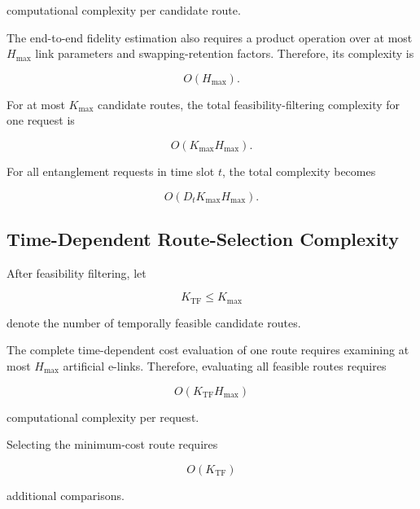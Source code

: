 computational complexity per candidate route.

The end-to-end fidelity estimation also requires a product operation over at most $H_{\max}$ link parameters and swapping-retention factors. Therefore, its complexity is

\begin{equation}
    O
    \left(
    H_{\max}
    \right).
\end{equation}

For at most $K_{\max}$ candidate routes, the total feasibility-filtering complexity for one request is

\begin{equation}
    O
    \left(
    K_{\max}H_{\max}
    \right).
\end{equation}

For all entanglement requests in time slot $t$, the total complexity becomes

\begin{equation}
    O
    \left(
    D_tK_{\max}H_{\max}
    \right).
\end{equation}


\subsection{Time-Dependent Route-Selection Complexity}

After feasibility filtering, let

\begin{equation}
    K_{\mathrm{TF}}
    \leq
    K_{\max}
\end{equation}

denote the number of temporally feasible candidate routes.

The complete time-dependent cost evaluation of one route requires examining at most $H_{\max}$ artificial e-links. Therefore, evaluating all feasible routes requires

\begin{equation}
    O
    \left(
    K_{\mathrm{TF}}H_{\max}
    \right)
\end{equation}

computational complexity per request.

Selecting the minimum-cost route requires

\begin{equation}
    O
    \left(
    K_{\mathrm{TF}}
    \right)
\end{equation}

additional comparisons.

